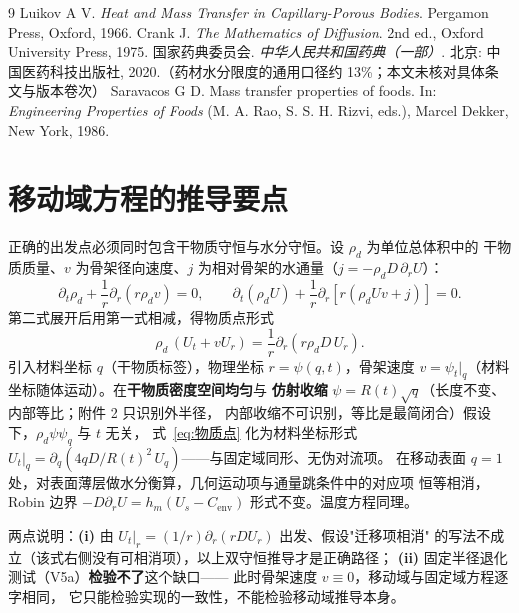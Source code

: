 \documentclass[12pt,a4paper]{ctexart}
\numberwithin{equation}{section}
\begin{document}
\begin{thebibliography}{9}
 Luikov A V. \emph{Heat and Mass Transfer in Capillary-Porous Bodies}.
Pergamon Press, Oxford, 1966.
 Crank J. \emph{The Mathematics of Diffusion}. 2nd ed.,
Oxford University Press, 1975.
 国家药典委员会. \emph{中华人民共和国药典（一部）}.
北京: 中国医药科技出版社, 2020.（药材水分限度的通用口径约 13\%；本文未核对具体条文与版本卷次）
 Saravacos G D. Mass transfer properties of foods. In:
\emph{Engineering Properties of Foods} (M. A. Rao, S. S. H. Rizvi, eds.),
Marcel Dekker, New York, 1986.
\end{thebibliography}

\appendix
\section{移动域方程的推导要点}\label{app:移动域}
正确的出发点必须同时包含干物质守恒与水分守恒。设 $\rho_d$ 为单位总体积中的
干物质质量、$v$ 为骨架径向速度、$j$ 为相对骨架的水通量（$j=-\rho_d D\,\partial_r U$）：
\begin{equation}
\partial_t\rho_d+\frac1r\partial_r(r\rho_d v)=0,\qquad
\partial_t(\rho_d U)+\frac1r\partial_r\!\left[r(\rho_d Uv+j)\right]=0 .
\end{equation}
第二式展开后用第一式相减，得物质点形式
\begin{equation}
\rho_d\,(U_t+vU_r)=\frac1r\partial_r\!\left(r\rho_d D\,U_r\right).
\label{eq:物质点}
\end{equation}
引入材料坐标 $q$（干物质标签），物理坐标 $r=\psi(q,t)$，骨架速度
$v=\psi_t|_q$（材料坐标随体运动）。在\textbf{干物质密度空间均匀}与
\textbf{仿射收缩} $\psi=R(t)\sqrt q$（长度不变、内部等比；附件 2 只识别外半径，
内部收缩不可识别，等比是最简闭合）假设下，$\rho_d\psi\psi_q$ 与 $t$ 无关，
式~\eqref{eq:物质点} 化为材料坐标形式
$U_t|_q=\partial_q\!\left(4qD/R(t)^2\,U_q\right)$——与固定域同形、无伪对流项。
在移动表面 $q=1$ 处，对表面薄层做水分衡算，几何运动项与通量跳条件中的对应项
恒等相消，Robin 边界 $-D\partial_rU=h_m(U_s-C_{\mathrm{env}})$ 形式不变。温度方程同理。

两点说明：\textbf{(i)} 由 $U_t|_r=(1/r)\partial_r(rDU_r)$ 出发、假设"迁移项相消"
的写法不成立（该式右侧没有可相消项），以上双守恒推导才是正确路径；
\textbf{(ii)} 固定半径退化测试（V5a）\textbf{检验不了}这个缺口——
此时骨架速度 $v\equiv0$，移动域与固定域方程逐字相同，
它只能检验实现的一致性，不能检验移动域推导本身。
\end{document}
